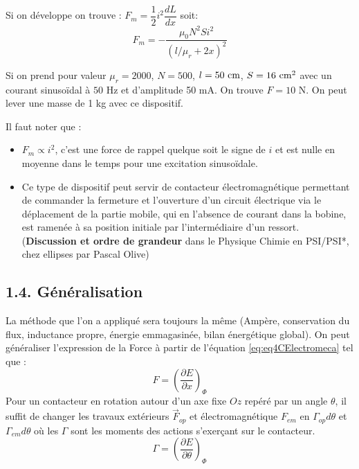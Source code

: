 \documentclass[french, a4paper, 10pt, twocolumn, landscape]{article}
\begin{document}
Si on développe on trouve : $F_{m}= \dfrac{1}{2}i^2\dfrac{dL}{dx}$ soit:
\begin{equation}
	F_{m} = -\dfrac{\mu_0N^2Si^2}{\left(l/\mu_r+2x\right)^2}
\end{equation}

Si on prend pour valeur $\mu_r=2000$, $N = 500$, $l=50~\rm cm$, $S=16~\rm cm^2$ avec un courant sinusoïdal à $50$ Hz et d'amplitude 50 mA. On trouve $F = 10$ N. On peut lever une masse de 1 kg avec ce dispositif. 

\begin{Resultat}{Il faut noter que :}
	\begin{itemize}
		\item $F_{m}\propto i^2$, c'est une force de rappel quelque soit le signe de $i$ et est nulle en moyenne dans le temps pour une excitation sinusoïdale.
		\item Ce type de dispositif peut servir de contacteur électromagnétique permettant de commander la fermeture et l'ouverture d'un circuit électrique via le déplacement de la partie mobile, qui en l'absence de courant dans la bobine, est ramenée à sa position initiale par l'intermédiaire d'un ressort.
		(\textbf{Discussion et ordre de grandeur} dans le Physique Chimie en PSI/PSI*, chez ellipses par Pascal Olive)
	\end{itemize}
\end{Resultat}

\subsection*{1.4. Généralisation}
La méthode que l'on a appliqué sera toujours la même (Ampère, conservation du flux, inductance propre, énergie emmagasinée, bilan énergétique global). On peut généraliser l'expression de la Force à partir de l'équation \eqref{eq:eq4CElectromeca} tel que : 
\begin{equation}
    F=\left(\dfrac{\partial E}{\partial x}\right)_\Phi
\end{equation}
Pour un contacteur en rotation autour d'un axe fixe $Oz$ repéré par un angle $\theta$, il suffit de changer les travaux extérieurs $\vec{F}_{op}$ et électromagnétique $F_{em}$ en $\Gamma_{op}d\theta$ et $\Gamma_{em}d\theta$ où les $\Gamma$ sont les moments des actions s'exerçant sur le contacteur. 
\begin{equation}
 \Gamma = \left(\dfrac{\partial E}{\partial\theta}\right)_\Phi
\end{equation}
\end{document}
